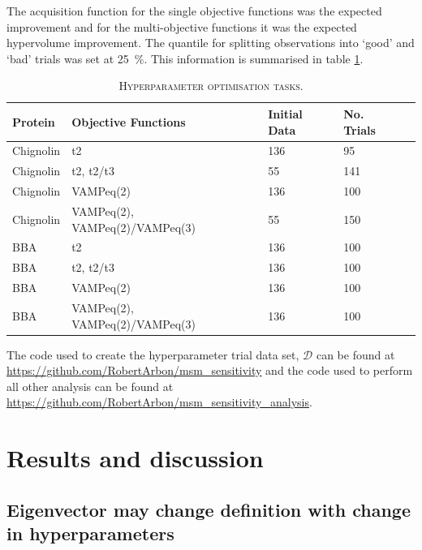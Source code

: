 \documentclass[journal=jacsat,manuscript=article]{achemso}
\begin{document}
The acquisition function for the single objective functions was the expected improvement and for the multi-objective functions it was the expected hypervolume improvement. The quantile for splitting observations into `good' and `bad' trials was set at \SI{25}{\percent}. This information is summarised in table \ref{tab:opt_description}. 

\begin{table}[h]
    \caption{\textsc{Hyperparameter optimisation tasks.}}
    \begin{tabularx}{\textwidth}{llXXX}
    \toprule
    \textbf{Protein} & \textbf{Objective Functions} & \textbf{Initial Data} & \textbf{No. Trials} \\ 
    
    \midrule
    Chignolin & t2        & 136 & 95 \\
    Chignolin & t2, t2/t3 & 55 & 141 \\
    Chignolin & VAMPeq(2) & 136 & 100 \\

    Chignolin & VAMPeq(2), VAMPeq(2)/VAMPeq(3) & 55 & 150 \\

    BBA & t2        & 136 & 100 \\
    BBA & t2, t2/t3 & 136 & 100 \\
    BBA & VAMPeq(2) & 136 & 100 \\
    BBA & VAMPeq(2), VAMPeq(2)/VAMPeq(3) & 136 & 100 \\
    \bottomrule
    \end{tabularx}
    \label{tab:opt_description}
\end{table}

The code used to create the hyperparameter trial data set, $\mathcal{D}$ can be found at \url{https://github.com/RobertArbon/msm_sensitivity} and the code used to perform all other analysis can be found at \url{https://github.com/RobertArbon/msm_sensitivity_analysis}.  




\section{Results and discussion}

\subsection{Eigenvector may change definition with change in hyperparameters}\label{sec:evs_change}
\end{document}
